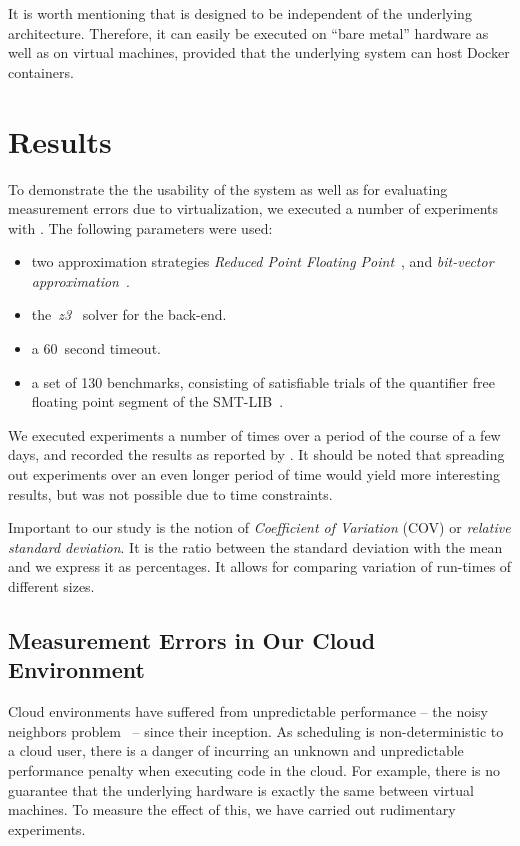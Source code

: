 \documentclass[a4paper]{IEEEtran}
\begin{document}
It is worth mentioning that \testbench{} is designed to be independent of the
underlying architecture. Therefore, it can easily be executed on ``bare metal''
hardware as well as on virtual machines, provided that the underlying system can
host Docker containers.

\section{Results}
To demonstrate the the usability of the system as well as for evaluating
measurement errors due to virtualization, we executed a number of experiments
with \testbench{}. The following parameters were used:
\begin{itemize}
\item two approximation strategies \emph{Reduced Point Floating
  Point}~\cite{uppsat}, and \emph{bit-vector
  approximation}~\cite{joel}.

\item the~\emph{z3}~\cite{z3} solver for the back-end.

\item a 60~second timeout.

\item a set of 130 benchmarks, consisting of satisfiable trials of the
  quantifier free floating point segment of the SMT-LIB~\cite{smtlib}.
\end{itemize}
We executed experiments a number of times over a period of the course
of a few days, and recorded the results as reported by
\testbench{}. It should be noted that spreading out experiments over
an even longer period of time would yield more interesting results,
but was not possible due to time constraints.

Important to our study is the notion of \emph{Coefficient of
  Variation} (COV) or \emph{relative standard deviation}. It is the
ratio between the standard deviation with the mean and we express it
as percentages. It allows for comparing variation of run-times of
different sizes.

\subsection{Measurement Errors in Our Cloud Environment}
Cloud environments have suffered from unpredictable performance -- the
noisy neighbors problem~\cite{williamson} -- since their inception. As
scheduling is non-deterministic to a cloud user, there is a danger of
incurring an unknown and unpredictable performance penalty when
executing code in the cloud. For example, there is no guarantee that
the underlying hardware is exactly the same between virtual
machines. To measure the effect of this, we have carried out
rudimentary experiments.
\end{document}
